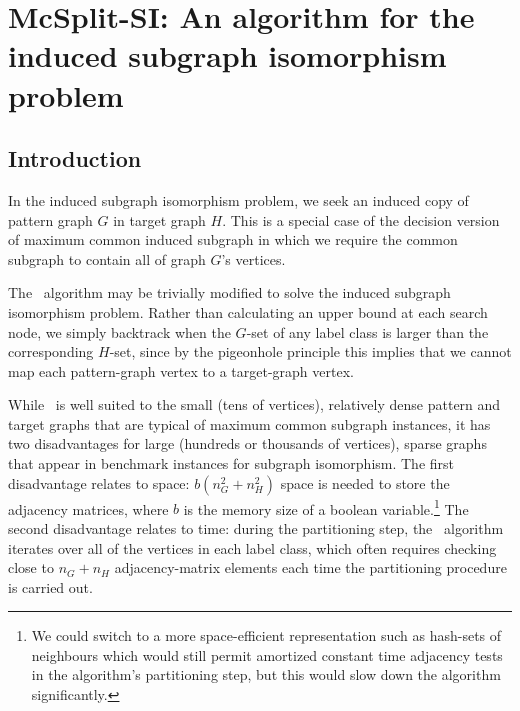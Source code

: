 
\newcommand{\varStartG}{\ensuremath{\AlgVar{start}_G}}
\newcommand{\varEndG}{\ensuremath{\AlgVar{end}_G}}
\newcommand{\varStartH}{\ensuremath{\AlgVar{start}_H}}
\newcommand{\varEndH}{\ensuremath{\AlgVar{end}_H}}
\newcommand{\varActive}{\ensuremath{\AlgVar{active}}}
\newcommand{\varSplitting}{\ensuremath{\AlgVar{splitting}}}
\newcommand{\varPrev}{\ensuremath{\AlgVar{prev}}}
\newcommand{\varNext}{\ensuremath{\AlgVar{next}}}
\newcommand{\labelClass}{\ensuremath{\AlgVar{labelClass}}}
\newcommand{\vertexPtr}{\ensuremath{\AlgVar{vertexPtr}}}
\newcommand{\LC}{\ensuremath{\AlgVar{LC}}}
\newcommand{\Gptrs}{\ensuremath{\AlgVar{Gptrs}}}
\newcommand{\Hptrs}{\ensuremath{\AlgVar{Hptrs}}}
\newcommand{\Garray}{\ensuremath{\AlgVar{Garray}}}
\newcommand{\Harray}{\ensuremath{\AlgVar{Harray}}}

\chapter{McSplit-SI: An algorithm for the induced subgraph isomorphism problem}
\label{c:mcsplit-si}

\section{Introduction}

In the induced subgraph isomorphism problem, we seek an induced copy of pattern graph $G$ in target graph $H$. This is a special case of the decision version of maximum common induced subgraph in which we require the common subgraph to contain all of graph $G$'s vertices.

The \McSplit\ algorithm may be trivially modified to solve the induced subgraph isomorphism problem. Rather than calculating an upper bound at each search node, we simply backtrack when the $G$-set of any label class is larger than the corresponding $H$-set, since by the pigeonhole principle this implies that we cannot map each pattern-graph vertex to a target-graph vertex.

While \McSplit\ is well suited to the small (tens of vertices), relatively dense pattern and target graphs that are typical of maximum common subgraph instances, it has two disadvantages for large (hundreds or thousands of vertices), sparse graphs that appear in benchmark instances for subgraph isomorphism.  The first disadvantage relates to space: $b(n_G^2 + n_H^2)$ space is needed to store the adjacency matrices, where $b$ is the memory size of a boolean variable.\footnote{We could switch to a more space-efficient representation such as hash-sets of neighbours which would still permit amortized constant time adjacency tests in the algorithm's partitioning step, but this would slow down the algorithm significantly.}  The second disadvantage relates to time: during the partitioning step, the \McSplit\ algorithm iterates over all of the vertices in each label class, which often requires checking close to $n_G + n_H$ adjacency-matrix elements each time the partitioning procedure is carried out.

